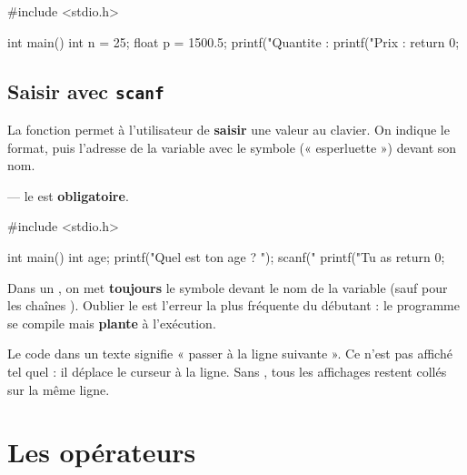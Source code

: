 \begin{codec}
#include <stdio.h>

int main()
{
    int n = 25;
    float p = 1500.5;
    printf("Quantite : %
    printf("Prix : %
    return 0;
}
\end{codec}


\subsection{Saisir avec \texttt{scanf}}

La fonction  permet à l'utilisateur de \textbf{saisir} une valeur au
clavier. On indique le format, puis l'adresse de la variable avec le symbole
\code{\&} (« esperluette ») devant son nom.

\begin{syntaxe}
\quad — le \code{\&} est \textbf{obligatoire}.
\end{syntaxe}

\begin{codec}
#include <stdio.h>

int main()
{
    int age;
    printf("Quel est ton age ? ");
    scanf("%
    printf("Tu as %
    return 0;
}
\end{codec}


\begin{attention}
Dans un , on met \textbf{toujours} le symbole \code{\&} devant le nom
de la variable (sauf pour les chaînes ). Oublier le \code{\&} est
l'erreur la plus fréquente du débutant : le programme se compile mais
\textbf{plante} à l'exécution.
\end{attention}

\begin{remarque}
Le code  dans un texte signifie « passer à la ligne
suivante ». Ce n'est pas affiché tel quel : il déplace le curseur à la ligne. Sans
, tous les affichages restent collés sur la même ligne.
\end{remarque}

\section{Les opérateurs}

